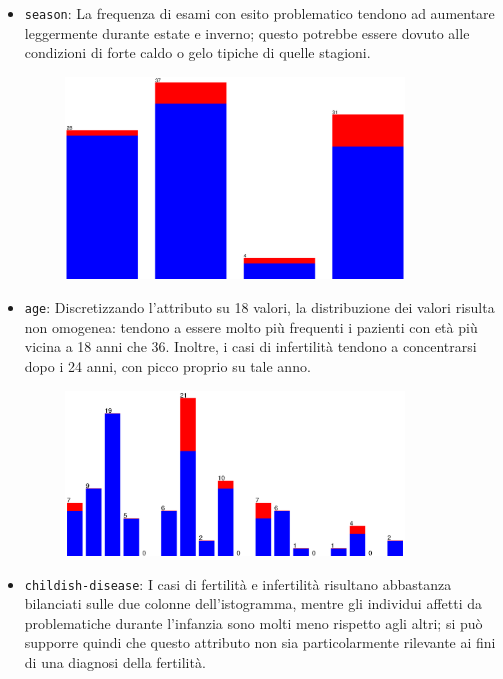 \begin{itemize}
  \item \texttt{season}:
    La frequenza di esami con esito problematico tendono ad aumentare leggermente durante estate e inverno;
    questo potrebbe essere dovuto alle condizioni di forte caldo o gelo tipiche di quelle stagioni.
    \begin{figure}[H]
      \centering
      \includegraphics[width=0.85\textwidth]{fig/season.eps}
    \end{figure}
  \item \texttt{age}:
    Discretizzando l'attributo su 18 valori, la distribuzione dei valori risulta non omogenea:
    tendono a essere molto più frequenti i pazienti con età più vicina a 18 anni che 36.
    Inoltre, i casi di infertilità tendono a concentrarsi dopo i 24 anni, con picco proprio su tale anno.
    \begin{figure}[H]
      \centering
      \includegraphics[width=0.85\textwidth]{fig/age-discrete.eps}
    \end{figure}
  \item \texttt{childish-disease}:
    I casi di fertilità e infertilità risultano abbastanza bilanciati sulle due colonne dell'istogramma,
    mentre gli individui affetti da problematiche durante l'infanzia sono molti meno rispetto agli altri;
    si può supporre quindi che questo attributo non sia particolarmente rilevante ai fini di una diagnosi della fertilità.

\end{itemize}
